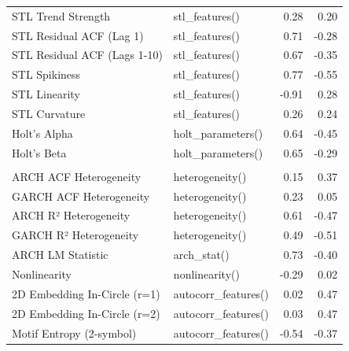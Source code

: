 \begin{table}
\begin{tabular}[t]{llrr}
\hspace{1em}STL Trend Strength & stl\_features() & 0.28 & 0.20\\
\hspace{1em}STL Residual ACF (Lag 1) & stl\_features() & 0.71 & -0.28\\
\hspace{1em}STL Residual ACF (Lags 1-10) & stl\_features() & 0.67 & -0.35\\
\hspace{1em}STL Spikiness & stl\_features() & 0.77 & -0.55\\
\hspace{1em}STL Linearity & stl\_features() & -0.91 & 0.28\\
\hspace{1em}STL Curvature & stl\_features() & 0.26 & 0.24\\
\hspace{1em}Holt's Alpha & holt\_parameters() & 0.64 & -0.45\\
\hspace{1em}Holt's Beta & holt\_parameters() & 0.65 & -0.29\\
\addlinespace[0.3em]
\multicolumn{4}{l}{\textbf{Volatility \& Nonlinear Dynamics}}\\
\hspace{1em}ARCH ACF Heterogeneity & heterogeneity() & 0.15 & 0.37\\
\hspace{1em}GARCH ACF Heterogeneity & heterogeneity() & 0.23 & 0.05\\
\hspace{1em}ARCH R² Heterogeneity & heterogeneity() & 0.61 & -0.47\\
\hspace{1em}GARCH R² Heterogeneity & heterogeneity() & 0.49 & -0.51\\
\hspace{1em}ARCH LM Statistic & arch\_stat() & 0.73 & -0.40\\
\hspace{1em}Nonlinearity & nonlinearity() & -0.29 & 0.02\\
\hspace{1em}2D Embedding In-Circle (r=1) & autocorr\_features() & 0.02 & 0.47\\
\hspace{1em}2D Embedding In-Circle (r=2) & autocorr\_features() & 0.03 & 0.47\\
\hspace{1em}Motif Entropy (2-symbol) & autocorr\_features() & -0.54 & -0.37\\

\end{tabular}
\end{table}
